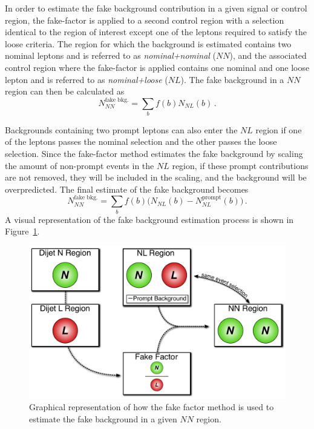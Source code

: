 In order to estimate the fake background contribution in a given signal or control region, the fake-factor is applied to a second control region with a selection identical to the region of interest except one of the leptons required to satisfy the loose criteria.
The region for which the background is estimated contains two nominal leptons and is referred to as \emph{nominal+nominal} ($NN$), and the associated control region where the fake-factor is applied contains one nominal and one loose lepton and is referred to as \emph{nominal+loose} ($NL$).
The fake background in a $NN$ region can then be calculated as
\begin{equation}
N_{NN}^{\textrm{fake\ bkg.}} = \sum\limits_{b}f(b) N_{NL}(b)\,.
\label{eq:ssww13tev_ff_bkg_nosub}
\end{equation}

Backgrounds containing two prompt leptons can also enter the $NL$ region if one of the leptons passes the nominal selection and the other passes the loose selection.
Since the fake-factor method estimates the fake background by scaling the amount of non-prompt events in the $NL$ region, if these prompt contributions are not removed, they will be included in the scaling, and the background will be overpredicted.
The final estimate of the fake background becomes
\begin{equation}
N_{NN}^{\textrm{fake\ bkg.}} = \sum\limits_{b}f(b) \big(N_{NL}(b) - N_{NL}^{\textrm{prompt}}(b)\big)\,.
\label{eq:ssww13tev_ff_bkg}
\end{equation}
A visual representation of the fake background estimation process is shown in Figure~\ref{fig:ssww13tev_ff_apply}.

\begin{figure}[htbp]
  \centering
  \includegraphics[width=.8\textwidth]{figs/ssww_13tev/backgrounds/ff/fake_factor}
  \caption{Graphical representation of how the fake factor method is used to estimate the fake background in a given $NN$ region.}
  \label{fig:ssww13tev_ff_apply}
\end{figure}

